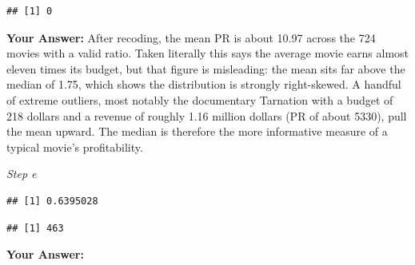 \documentclass[
]{article}
\newenvironment{Shaded}{\begin{snugshade}}{\end{snugshade}}
\newcommand{\AttributeTok}[1]{\textcolor[rgb]{0.13,0.29,0.53}{#1}}
\newcommand{\CommentTok}[1]{\textcolor[rgb]{0.56,0.35,0.01}{\textit{#1}}}
\newcommand{\ConstantTok}[1]{\textcolor[rgb]{0.56,0.35,0.01}{#1}}
\newcommand{\DecValTok}[1]{\textcolor[rgb]{0.00,0.00,0.81}{#1}}
\newcommand{\FunctionTok}[1]{\textcolor[rgb]{0.13,0.29,0.53}{\textbf{#1}}}
\newcommand{\NormalTok}[1]{#1}
\newcommand{\SpecialCharTok}[1]{\textcolor[rgb]{0.81,0.36,0.00}{\textbf{#1}}}
\begin{document}
\begin{Shaded}
\end{Shaded}

\begin{verbatim}
## [1] 0
\end{verbatim}

\textbf{Your Answer:} After recoding, the mean PR is about 10.97 across
the 724 movies with a valid ratio. Taken literally this says the average
movie earns almost eleven times its budget, but that figure is
misleading: the mean sits far above the median of 1.75, which shows the
distribution is strongly right-skewed. A handful of extreme outliers,
most notably the documentary Tarnation with a budget of 218 dollars and
a revenue of roughly 1.16 million dollars (PR of about 5330), pull the
mean upward. The median is therefore the more informative measure of a
typical movie's profitability.

\emph{Step e}

\begin{Shaded}
\end{Shaded}

\begin{verbatim}
## [1] 0.6395028
\end{verbatim}

\begin{Shaded}
\end{Shaded}

\begin{verbatim}
## [1] 463
\end{verbatim}

\textbf{Your Answer:}
\end{document}
